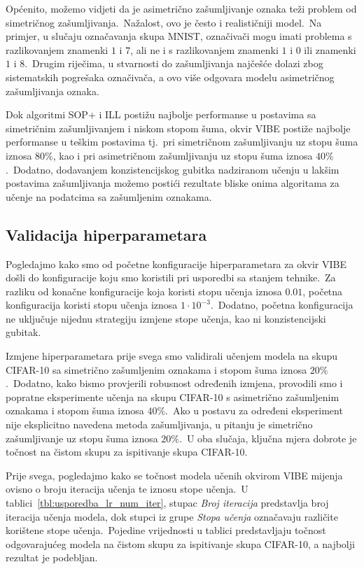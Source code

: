 \documentclass[diplomskirad]{fer}
\begin{document}
Općenito, možemo vidjeti da je asimetrično zašumljivanje oznaka teži problem od simetričnog zašumljivanja.\ 
Nažalost, ovo je često i realističniji model.\ Na primjer, u slučaju označavanja skupa MNIST, označivači mogu imati problema s razlikovanjem znamenki $1$ i $7$, ali ne i s razlikovanjem znamenki $1$ i $0$ ili znamenki $1$ i $8$.\ 
Drugim riječima, u stvarnosti do zašumljivanja najčešće dolazi zbog sistematskih pogrešaka označivača, a ovo više odgovara modelu asimetričnog zašumljivanja oznaka.\ 

Dok algoritmi SOP+ i ILL postižu najbolje performanse u postavima sa simetričnim zašumljivanjem i niskom stopom šuma, okvir VIBE postiže najbolje performanse u teškim postavima tj.\ pri simetričnom zašumljivanju uz stopu šuma iznosa $80\%$, kao i pri asimetričnom zašumljivanju uz stopu šuma iznosa $40\%$.\ 
Dodatno, dodavanjem konzistencijskog gubitka nadziranom učenju u lakšim postavima zašumljivanja možemo postići rezultate bliske onima algoritama za učenje na podatcima sa zašumljenim oznakama.\ 

\subsection{Validacija hiperparametara}
\label{sub:validacija_zasumljene}

Pogledajmo kako smo od početne konfiguracije hiperparametara za okvir VIBE došli do konfiguracije koju smo koristili pri usporedbi sa stanjem tehnike.\ 
Za razliku od konačne konfiguracije koja koristi stopu učenja iznosa $0.01$, početna konfiguracija koristi stopu učenja iznosa $1 \cdot 10^{-3}$.\ 
Dodatno, početna konfiguracija ne uključuje nijednu strategiju izmjene stope učenja, kao ni konzistencijski gubitak.\ 

Izmjene hiperparametara prije svega smo validirali učenjem modela na skupu CIFAR-10 sa simetrično zašumljenim oznakama i stopom šuma iznosa $20\%$.\ 
Dodatno, kako bismo provjerili robusnost određenih izmjena, provodili smo i popratne eksperimente učenja na skupu CIFAR-10 s asimetrično zašumljenim oznakama i stopom šuma iznosa $40\%$.\ 
Ako u postavu za određeni eksperiment nije eksplicitno navedena metoda zašumljivanja, u pitanju je simetrično zašumljivanje uz stopu šuma iznosa $20\%$.\
U oba slučaja, ključna mjera dobrote je točnost na čistom skupu za ispitivanje skupa CIFAR-10.\ 

Prije svega, pogledajmo kako se točnost modela učenih okvirom VIBE mijenja ovisno o broju iteracija učenja te iznosu stope učenja.\ 
U tablici~\ref{tbl:usporedba_lr_num_iter}, stupac \textit{Broj iteracija} predstavlja broj iteracija učenja modela, dok stupci iz grupe \textit{Stopa učenja} označavaju različite korištene stope učenja.\ 
Pojedine vrijednosti u tablici predstavljaju točnost odgovarajućeg modela na čistom skupu za ispitivanje skupa CIFAR-10, a najbolji rezultat je podebljan.\ 
\end{document}
